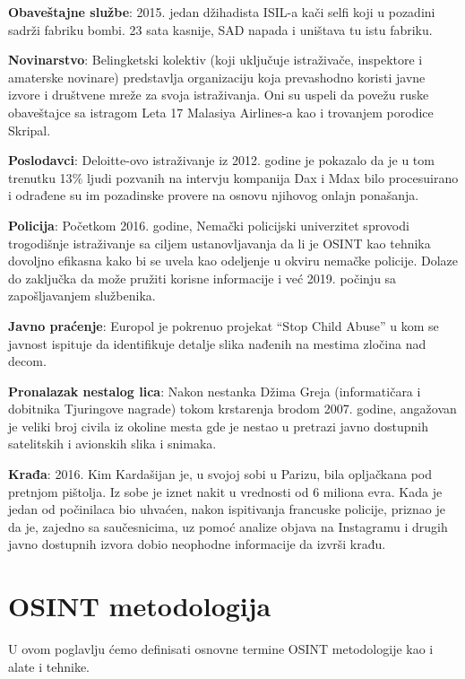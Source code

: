 \documentclass[a4paper, 11pt]{article}
\begin{document}
\textbf{Obaveštajne službe}: 2015. jedan džihadista ISIL-a kači selfi koji u pozadini sadrži fabriku bombi. 23 sata kasnije, SAD napada i uništava tu istu fabriku.\newline

\textbf{Novinarstvo}: Belingketski kolektiv (koji uključuje istraživače, inspektore i amaterske novinare) predstavlja organizaciju koja prevashodno koristi javne izvore i društvene mreže za svoja istraživanja. Oni su uspeli da povežu ruske obaveštajce sa istragom Leta 17 Malasiya Airlines-a kao i trovanjem porodice Skripal.\newline

\textbf{Poslodavci}: Deloitte-ovo istraživanje iz 2012. godine je pokazalo da je u tom trenutku 13$\%$ ljudi pozvanih na intervju kompanija Dax i Mdax bilo procesuirano i odrađene su im pozadinske provere na osnovu njihovog onlajn ponašanja.\newline

\textbf{Policija}: Početkom 2016. godine, Nemački policijski univerzitet sprovodi trogodišnje istraživanje sa ciljem ustanovljavanja da li je OSINT kao tehnika dovoljno efikasna kako bi se uvela kao odeljenje u okviru nemačke policije. Dolaze do zaključka da može pružiti korisne informacije i već 2019. počinju sa zapošljavanjem službenika.\newline

\textbf{Javno praćenje}:  Europol je pokrenuo projekat “Stop Child Abuse” u kom se javnost ispituje da identifikuje detalje slika nađenih na mestima zločina nad decom.\newline

\textbf{Pronalazak nestalog lica}: Nakon nestanka Džima Greja (informatičara i dobitnika Tjuringove nagrade) tokom krstarenja brodom 2007. godine, angažovan je veliki broj civila iz okoline mesta gde je nestao u pretrazi javno dostupnih satelitskih i avionskih slika i snimaka.\newline

\textbf{Krađa}: 2016. Kim Kardašijan je, u svojoj sobi u Parizu, bila opljačkana pod pretnjom pištolja. Iz sobe je iznet nakit u vrednosti od 6 miliona evra. Kada je jedan od počinilaca bio uhvaćen, nakon ispitivanja francuske policije, priznao je da je, zajedno sa saučesnicima, uz pomoć analize objava na Instagramu i drugih javno dostupnih izvora dobio neophodne informacije da izvrši krađu.\newpage
\section{OSINT metodologija}
U ovom poglavlju ćemo definisati osnovne termine OSINT metodologije kao i alate i tehnike.
\end{document}
